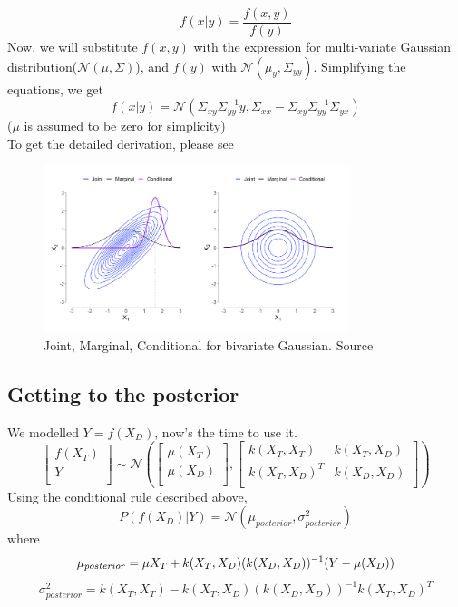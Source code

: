 \documentclass[12pt]{article}
\begin{document}
\[f(x\vert y) = \frac{f(x,y)}{f(y)}\]
Now, we will substitute $f(x,y)$ with the expression for multi-variate Gaussian distribution($\mathcal{N}(\mu, \Sigma)$), and $f(y)$ with $\mathcal{N}(\mu_{y}, \Sigma_{yy})$. 
Simplifying the equations, we get
\[
f(x\vert y)=
\mathcal{N}
(\Sigma_{xy}\Sigma_{yy}^{-1}y,
\Sigma_{xx} - \Sigma_{xy}\Sigma_{yy}^{-1}\Sigma_{yx})
\]
($\mu$ is assumed to be zero for simplicity)\\
To get the detailed derivation, please see \cite{prop}
\begin{figure}[h] 
    \begin{center}      \includegraphics[width=0.8\textwidth]   {rules.png} 
    \caption{Joint, Marginal, Conditional for bivariate Gaussian. Source\cite{prop}}
    \end{center} 
\end{figure}

\subsection{Getting to the posterior}
We modelled $Y=f(X_D)$, now's the time to use it.
\[
\begin{bmatrix}
    f(X_{T}) \\
    Y \\
\end{bmatrix}
\sim 
\mathcal{N}
\left(
\begin{bmatrix}
    \mu(X_{T}) \\
    \mu(X_{D}) \\
\end{bmatrix},
\begin{bmatrix}
    k(X_{T}, X_{T}) &  k(X_{T}, X_{D})\\
    k(X_{T}, X_{D})^{T} &  k(X_{D}, X_{D})\\
\end{bmatrix}
\right)
\]
Using the conditional rule described above,
\[
P(f(X_{D})\vert Y) = \mathcal{N}(\mu_{posterior}, \sigma_{posterior}^2)
\]
where
\[
\mu_{posterior} = \mu{X_{T}} + k(X_{T}, X_{D})(k(X_{D},X_{D}))^{-1}(Y-\mu(X_{D}))\\
\]
\[
\sigma_{posterior}^{2} = k(X_T,X_T) - k(X_T, X_D)(k(X_{D},X_{D}))^{-1}k(X_T, X_D)^{T}
\]
\end{document}
